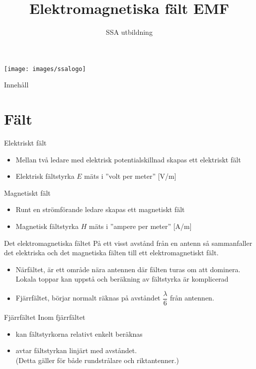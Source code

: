 \documentclass{beamer}
\title[SM7NTJ]{Elektromagnetiska fält EMF}
\author{SSA utbildning}
\begin{document}
\begin{frame}
\titlepage
\texttt{[image: images/ssalogo]}
\end{frame}

\begin{frame}{Innehåll}
\tableofcontents
\end{frame}

\section{Fält}

\begin{frame}{Elektriskt fält}

\begin{itemize}
	\item Mellan två ledare med elektrisk potentialskillnad	skapas ett
	elektriskt fält
	\item Elektrisk fältstyrka $E$ mäts i ''volt per meter'' [V/m] 
\end{itemize}
\end{frame}

\begin{frame}{Magnetiskt fält}

  \begin{itemize}
  	\item Runt en strömförande ledare skapas ett magnetiskt fält
  	\item Magnetisk fältstyrka $H$ mäts i ''ampere per meter'' [A/m]
  \end{itemize}
\end{frame}

\begin{frame}{Det elektromagnetiska fältet}
På ett visst avstånd från en antenn så sammanfaller det elektriska och det
magnetiska fälten till ett elektromagnetiskt fält.

\begin{itemize}
	\item Närfältet, är ett område nära antennen där fälten turas om att
	dominera. Lokala toppar kan uppstå och beräkning av fältstyrka är
	komplicerad
	\item Fjärrfältet, börjar normalt räknas på avståndet $\dfrac{\lambda}{6}$
	från antennen.
\end{itemize}
\end{frame}

\begin{frame}{Fjärrfältet}
Inom fjärrfältet
\begin{itemize}
	\item kan fältstyrkorna relativt enkelt beräknas
	\item avtar fältstyrkan linjärt med avståndet.\\
	(Detta gäller för både rundstrålare och riktantenner.)
\end{itemize}	
\end{frame}
\end{document}
